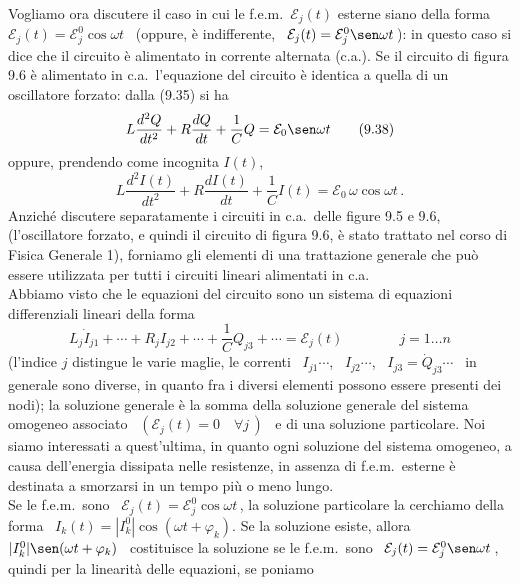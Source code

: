 Vogliamo ora discutere il caso in cui le f.e.m.\ $\mathcal E_j(t)$ esterne siano
della forma \ $\mathcal E_j(t)=\mathcal E_j^0\cos\omega t$ \ (oppure, \`e
indifferente, \ $\mathcal E_j(t)=\mathcal E_j^0\sen\omega t$\,): in questo caso
si dice che il circuito \`e alimentato in corrente alternata (c.a.). Se il
circuito di figura 9.6 \`e alimentato in c.a.\ l'equazione del circuito \`e
identica a quella di un oscillatore forzato: dalla (9.35) si ha
\begin{equation}
  L\frac{d^2Q}{dt^2}+R\frac{dQ}{dt}+\frac{1}{C}Q=\mathcal E_0\sen\omega t
  \tag{9.38}
\end{equation}
oppure, prendendo come incognita $I(t)$,
\begin{equation}
  L\frac{d^2I(t)}{dt^2}+R\frac{dI(t)}{dt}+\frac{1}{C}I(t)
  =\mathcal E_0\,\omega\cos\omega t\,.
  \tag{9.39}
\end{equation}
Anzich\'e discutere separatamente i circuiti in c.a.\ delle figure 9.5 e 9.6,
(l'oscillatore forzato, e quindi il circuito di figura 9.6, \`e stato trattato
nel corso di Fisica Generale 1), forniamo gli elementi di una trattazione
generale che pu\`o essere utilizzata per tutti i circuiti lineari alimentati in
c.a.\\
Abbiamo visto che le equazioni del circuito sono un sistema di equazioni
differenziali lineari della forma
\begin{equation}
  L_j\dot I_{j1}+\cdots+R_jI_{j2}+\cdots+\frac{1}{C}Q_{j3}+\cdots
  =\mathcal E_j(t)\qquad\qquad j=1\dots n
  \tag{9.40}
\end{equation}
(l'indice $j$ distingue le varie maglie, le correnti \ $I_{j1}\cdots$,
\ $I_{j2}\cdots$, \ $I_{j3}=\dot Q_{j3}\cdots$ \ in generale sono diverse, in
quanto fra i diversi elementi possono essere presenti dei nodi); la soluzione
generale \`e la somma della soluzione generale del sistema omogeneo associato
\ $(\mathcal E_j(t)=0\quad\forall j\,)$ \ e di una soluzione particolare. Noi
siamo interessati a quest'ultima, in quanto ogni soluzione del sistema omogeneo,
a causa dell'energia dissipata nelle resistenze, in assenza di f.e.m.\ esterne
\`e destinata a smorzarsi in un tempo pi\`u o meno lungo.\\
Se le f.e.m.\ sono \ $\mathcal E_j(t)=\mathcal E_j^0\cos\omega t$\,, la
soluzione particolare la cerchiamo della forma
\ $I_k(t)=|I_k^0|\cos(\omega t+\varphi_k)$. Se la soluzione esiste, allora
\ $|I_k^0|\sen(\omega t+\varphi_k)$ \ costituisce la soluzione se le
f.e.m.\ sono \ $\mathcal E_j(t)=\mathcal E_j^0\sen\omega t$\,, quindi per la
linearit\`a delle equazioni, se poniamo

